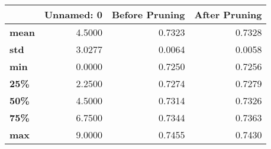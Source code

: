 \begin{tabular}{lrrr}
\toprule
{} &  Unnamed: 0 &  Before Pruning &  After Pruning \\
\midrule
\textbf{mean} &      4.5000 &          0.7323 &         0.7328 \\
\textbf{std } &      3.0277 &          0.0064 &         0.0058 \\
\textbf{min } &      0.0000 &          0.7250 &         0.7256 \\
\textbf{25\% } &      2.2500 &          0.7274 &         0.7279 \\
\textbf{50\% } &      4.5000 &          0.7314 &         0.7326 \\
\textbf{75\% } &      6.7500 &          0.7344 &         0.7363 \\
\textbf{max } &      9.0000 &          0.7455 &         0.7430 \\
\bottomrule
\end{tabular}
